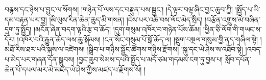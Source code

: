 བརྙས་དང་ཉེས་པ་བྱུང་ལ་སོགས། །གཉེན་པོ་ལས་དང་བརྫུན་པས་སྦྱང་། །དེ་ལྟར་བལྟ་ཞིང་བྱང་ཆུབ་ཀྱི། །སྤྱོད་པ་ཡི་དམ་བརྟན་པར་བྱ། །མི་ལུས་རིན་ཆེན་ཆུད་མི་གསན། །ངེས་པར་འཆི་བས་ལོང་མེད་སྲིད། །བརྩོན་འགྲུས་མེ་བཞིན་དྲག་ཏུ་སྤྱོད། །མངོན་ཞེན་བདག་ལྟའི་རྩ་བ་ཆོད། །དུག་གསུམ་འཁོར་བ་གཉེན་པོས་ཆོམ། །ཕྱིན་ཅི་ལོག་གི་གཡང་ས་དོར། །འཁོར་བའི་རྒྱུན་ཆོད་ལས་ཆུ་སྐོམས། །ངན་སོང་གསུམ་པོ་སྒོ་ཆོད་ལ། །སྡུག་བསྔལ་གསུམ་གྱི་ནད་གཞིལ་སྟེ། །མཐོ་རིས་ཐར་པའི་སྐས་ལ་འཛེགས། །སྒྲིབ་པ་གཉིས་སྦྱོང་ཚོགས་གཉིས་རྫོགས། །སྐུ་དང་ཡེ་ཤེས་ས་འཐོབ་སྟེ། །འབད་པ་མེད་པར་གཞན་དོན་སྒྲུབས། །བྱང་ཆུབ་སེམས་དཔའི་སྤྱོད་པ་མདོ་ཙམ་གདམས་ངག་ཏུ་བྱས་པ། སློབ་དཔོན་ཆེན་པོ་དཔལ་མར་མེ་མཛད་ཡེ་ཤེས་ཀྱིས་མཛད་པ་རྫོགས་སོ། །